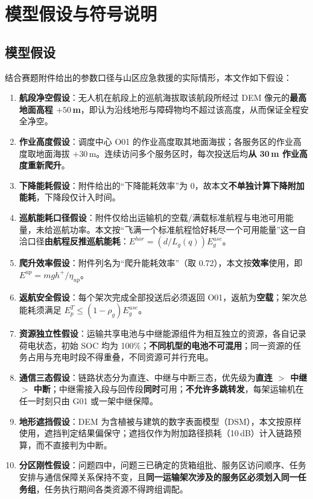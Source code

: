 \section{模型假设与符号说明}
\subsection{模型假设}

结合赛题附件给出的参数口径与山区应急救援的实际情形，本文作如下假设：

\begin{enumerate}[label=\textbf{假设 \arabic*}]
	\item \textbf{航段净空假设}：无人机在航段上的巡航海拔取该航段所经过 DEM 像元的\textbf{最高地面高程 $+50$\,m}，即认为沿线地形与障碍物均不超过该高度，从而保证全程安全净空。
	\item \textbf{作业高度假设}：调度中心 O01 的作业高度取其地面海拔；各服务区的作业高度取地面海拔 $+30$\,m。连续访问多个服务区时，每次投送后均\textbf{从 30\,m 作业高度重新爬升}。
	\item \textbf{下降能耗假设}：附件给出的“下降能耗效率”为 0，故本文\textbf{不单独计算下降附加能耗}，下降段仅计入时间。
	\item \textbf{巡航能耗口径假设}：附件仅给出运输机的空载/满载标准航程与电池可用能量，未给巡航功率。本文按“飞满一个标准航程恰好耗尽一个可用能量”这一自洽口径\textbf{由航程反推巡航能耗}：$E^{hor}=(d/L_{g}(q))E_{g}^{use}$。
	\item \textbf{爬升效率假设}：附件列名为“爬升能耗效率”（取 0.72），本文按\textbf{效率}使用，即 $E^{up}=mgh^{+}/\eta_{up}$。
	\item \textbf{返航安全假设}：每个架次完成全部投送后必须返回 O01，返航为\textbf{空载}；架次总能耗须满足 $E_{p}^{T}\le(1-\rho_{g})E_{g}^{use}$。
	\item \textbf{资源独立性假设}：运输共享电池与中继能源组件为相互独立的资源，各自记录荷电状态，初始 SOC 均为 100\%；\textbf{不同机型的电池不可混用}；同一资源的任务占用与充电时段不得重叠，不同资源可并行充电。
	\item \textbf{通信三态假设}：链路状态分为直连、中继与中断三态，优先级为\textbf{直连 $>$ 中继 $>$ 中断}；中继需接入段与回传段\textbf{同时}可用；\textbf{不允许多跳转发}，每架运输机在任一时刻只由 G01 或一架中继保障。
	\item \textbf{地形遮挡假设}：DEM 为含植被与建筑的数字表面模型（DSM），本文按原样使用，遮挡判定结果偏保守；遮挡仅作为附加路径损耗（10\,dB）计入链路预算，而不直接判为中断。
	\item \textbf{分区刚性假设}：问题四中，问题三已确定的货箱组批、服务区访问顺序、任务安排与通信保障关系保持不变，且\textbf{同一运输架次涉及的服务区必须划入同一任务组}，任务执行期间各类资源不得跨组调配。
\end{enumerate}

